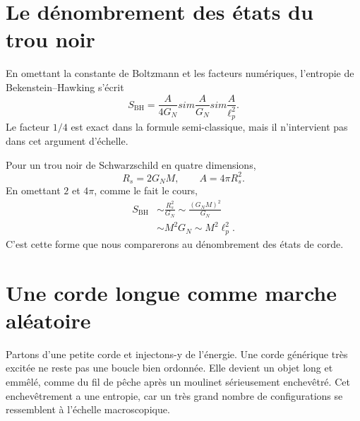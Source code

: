 \begin{classroomqa}
\end{classroomqa}

\section{Le dénombrement des états du trou noir}

En omettant la constante de Boltzmann et les facteurs numériques, l’entropie de Bekenstein--Hawking s’écrit
\begin{equation}
S_{\mathrm{BH}}=\frac{A}{4G_N}sim\frac{A}{G_N}sim\frac{A}{\ell_p^2}.
\label{eq:l06-bh-area}
\end{equation}
Le facteur \(1/4\) est exact dans la formule semi-classique, mais il n’intervient pas dans cet argument d’échelle.

\begin{classroomqa}
\end{classroomqa}

Pour un trou noir de Schwarzschild en quatre dimensions,
\begin{equation}
R_s=2G_NM,
\qquad
A=4\pi R_s^2.
\end{equation}
En omettant \(2\) et \(4\pi\), comme le fait le cours,
\begin{align}
S_{\mathrm{BH}}
&\sim \frac{R_s^2}{G_N}
\sim \frac{(G_NM)^2}{G_N} \\
&\sim M^2G_N
\sim M^2\ell_p^2.
\label{eq:l06-bh-mass}
\end{align}
C’est cette forme que nous comparerons au dénombrement des états de corde.

\section{Une corde longue comme marche aléatoire}

Partons d’une petite corde et injectons-y de l’énergie. Une corde générique très excitée ne reste pas une boucle bien ordonnée. Elle devient un objet long et emmêlé, comme du fil de pêche après un moulinet sérieusement enchevêtré. Cet enchevêtrement a une entropie, car un très grand nombre de configurations se ressemblent à l’échelle macroscopique.

